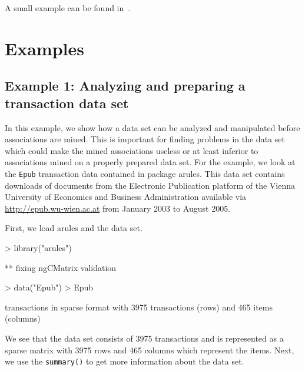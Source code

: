 \documentclass[10pt,a4paper]{article}
\newcommand{\strong}[1]{{\normalfont\fontseries{b}\selectfont #1}}
\newcommand{\func}[1]{\mbox{\texttt{#1()}}}
\newcommand{\code}[1]{\mbox{\texttt{#1}}}
\newcommand{\pkg}[1]{\strong{#1}}
\begin{document}
A small example can be found in~\cite{arules:Hahsler+Hornik:2007b}.

\section{Examples\label{sec:examples}}

\subsection{Example 1: Analyzing and preparing a transaction 
data set \label{sec:example-screen}}

In this example, 
we show how a data set can be analyzed and manipulated
before associations are mined.
This is important for finding problems in the data set which 
could make the mined associations useless or at least inferior
to associations mined on a properly prepared data set.
For the example,
we look at the \code{Epub} transaction data contained in
package \pkg{arules}.  This data set contains downloads of documents
from the Electronic Publication platform of the Vienna University of
Economics and Business Administration available via
\url{http://epub.wu-wien.ac.at} from January 2003 to August 2005.

First, we load \pkg{arules} and the data set.

\begin{Schunk}
\begin{Sinput}
> library("arules")
\end{Sinput}
\begin{Soutput}
** fixing ngCMatrix validation
\end{Soutput}
\end{Schunk}

\begin{Schunk}
\begin{Sinput}
> data("Epub")
> Epub
\end{Sinput}
\begin{Soutput}
transactions in sparse format with
 3975 transactions (rows) and
 465 items (columns)
\end{Soutput}
\end{Schunk}

We see that the data set consists of 3975 transactions
and is represented as a sparse matrix with 3975 rows
and 465 columns which represent the items. 
Next, we use the \func{summary} to get more information about the 
data set.
\end{document}
